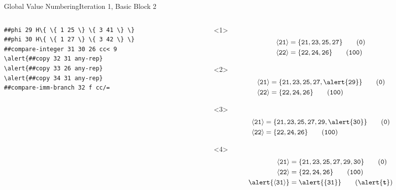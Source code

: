 \documentclass{beamer}
\newcommand{\vn}[1]{\ensuremath{\langle\texttt{#1}\rangle}}
\newcommand{\vreg}[1]{\texttt{#1}}
\begin{document}
\begin{frame}[fragile]{Global Value Numbering}{Iteration 1, Basic Block 2}
\begin{columns}[t,onlytextwidth]
\begin{column}[t]{.5\textwidth}
\begin{onlyenv}
\begin{Verbatim}[frame=single,commandchars=\\\{\}]
##phi 29 H\{ \{ 1 25 \} \{ 3 41 \} \}
##phi 30 H\{ \{ 1 27 \} \{ 3 42 \} \}
##compare-integer 31 30 26 cc< 9
\alert{##copy 32 31 any-rep}
\alert{##copy 33 26 any-rep}
\alert{##copy 34 31 any-rep}
##compare-imm-branch 32 f cc/=
        \end{Verbatim}
      \end{onlyenv}
    \end{column}
    \begin{column}{.5\textwidth}
      \begin{onlyenv}<1>
        \begin{align*}
          \vn{21} &= \{\vreg{21}, \vreg{23}, \vreg{25}, \vreg{27}\} \tag{\texttt{0}}   \\
          \vn{22} &= \{\vreg{22}, \vreg{24}, \vreg{26}\}            \tag{\texttt{100}} \\
        \end{align*}
      \end{onlyenv}
      \begin{onlyenv}<2>
        \begin{align*}
          \vn{21} &= \{\vreg{21}, \vreg{23}, \vreg{25}, \vreg{27}, \alert{\vreg{29}}\} \tag{\texttt{0}}   \\
          \vn{22} &= \{\vreg{22}, \vreg{24}, \vreg{26}\}            \tag{\texttt{100}} \\
        \end{align*}
      \end{onlyenv}
      \begin{onlyenv}<3>
        \begin{align*}
          \vn{21} &= \{\vreg{21}, \vreg{23}, \vreg{25}, \vreg{27}, \vreg{29}, \alert{\vreg{30}}\} \tag{\texttt{0}}   \\
          \vn{22} &= \{\vreg{22}, \vreg{24}, \vreg{26}\}            \tag{\texttt{100}} \\
        \end{align*}
      \end{onlyenv}
      \begin{onlyenv}<4>
        \begin{align*}
          \vn{21} &= \{\vreg{21}, \vreg{23}, \vreg{25}, \vreg{27}, \vreg{29}, \vreg{30}\} \tag{\texttt{0}}   \\
          \vn{22} &= \{\vreg{22}, \vreg{24}, \vreg{26}\}            \tag{\texttt{100}} \\
          \alert{\vn{31}} &= \alert{\{\vreg{31}\}}                                  \tag{\alert{\texttt{\textbf{t}}}} \\

\end{align*}
\end{onlyenv}
\end{column}
\end{columns}
\end{frame}
\end{document}
